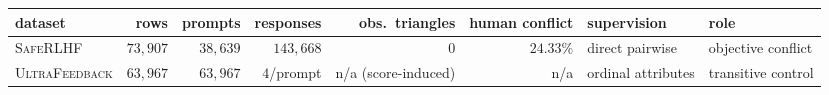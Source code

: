 \begin{tabular}{lrrrrrll}
\toprule
dataset & rows & prompts & responses & obs.\ triangles & human conflict & supervision & role\\
\midrule
\textsc{SafeRLHF} & $73{,}907$ & $38{,}639$ & $143{,}668$ & $0$ & $24.33\%$ & direct pairwise & objective conflict\\
\textsc{UltraFeedback} & $63{,}967$ & $63{,}967$ & $4$/prompt & n/a (score-induced) & n/a & ordinal attributes & transitive control\\
\bottomrule
\end{tabular}
